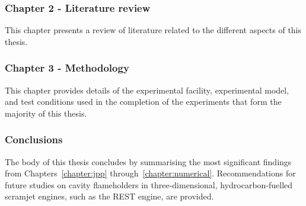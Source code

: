     \subsubsection*{Chapter 2 - Literature review}

      This chapter presents a review of literature related to the different aspects of this thesis. 

    \subsubsection*{Chapter 3 - Methodology}

      This chapter provides details of the experimental facility, experimental model, and test conditions used in the completion of the experiments that form the majority of this thesis. 

    \subsubsection*{Conclusions}

      The body of this thesis concludes by summarising the most significant findings from Chapters~\ref{chapter:jpp} through~\ref{chapter:numerical}. Recommendations for future studies on cavity flameholders in three-dimensional, hydrocarbon-fuelled scramjet engines, such as the REST engine, are provided.
